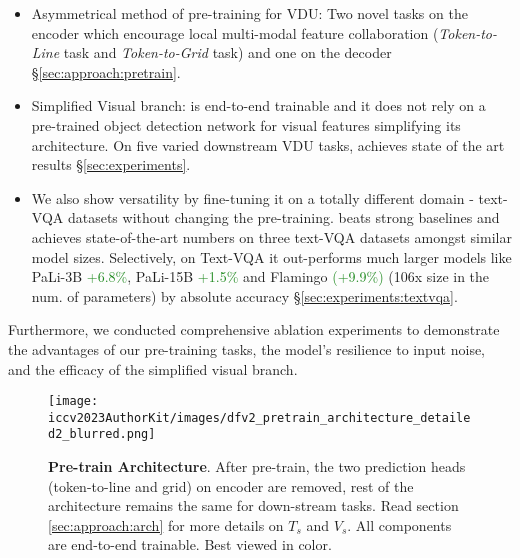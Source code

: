 \documentclass[10pt,twocolumn,letterpaper]{article}
\begin{document}
\begin{itemize}[leftmargin=*]
	\item Asymmetrical method of pre-training for VDU: Two novel tasks on the encoder which encourage local multi-modal feature collaboration (\textit{Token-to-Line} task and \textit{Token-to-Grid} task) and one on the decoder \S \ref{sec:approach:pretrain}. \item Simplified Visual branch: \papertitle is end-to-end trainable and it does not rely on a pre-trained object detection network for visual features simplifying its architecture. On five varied downstream VDU tasks, \papertitle achieves state of the art results \S \ref{sec:experiments}. 
	\item We also show \papertitle versatility by fine-tuning it on a totally different domain - text-VQA datasets without changing the pre-training. \papertitle beats strong baselines and achieves state-of-the-art numbers on three text-VQA datasets amongst similar model sizes. Selectively, on Text-VQA it out-performs much larger models like PaLi-3B \textcolor{forestgreen}{+6.8\%}, PaLi-15B \textcolor{forestgreen}{+1.5\%} and Flamingo\cite{Alayrac2022FlamingoAV} \textcolor{forestgreen}{(+9.9\%)} (106x \papertitle size in the num. of parameters) by  absolute accuracy \S \ref{sec:experiments:textvqa}. 
\end{itemize}

\noindent Furthermore, we conducted comprehensive ablation experiments to demonstrate the advantages of our pre-training tasks, the model's resilience to input noise, and the efficacy of the simplified visual branch.


\begin{figure*}[t]
  \centering
  \texttt{[image: iccv2023AuthorKit/images/dfv2\_pretrain\_architecture\_detailed2\_blurred.png]}
  \caption{\textbf{\papertitle  Pre-train Architecture}. After pre-train, the two prediction heads (token-to-line and grid) on encoder are removed, rest of the architecture remains the same for down-stream tasks. Read section \ref{sec:approach:arch} for more details on $T_s$ and $V_s$. All components are end-to-end trainable. Best viewed in color. }
  \label{fig:docformerv2_pretrain_architecture}
\end{figure*}
\end{document}
